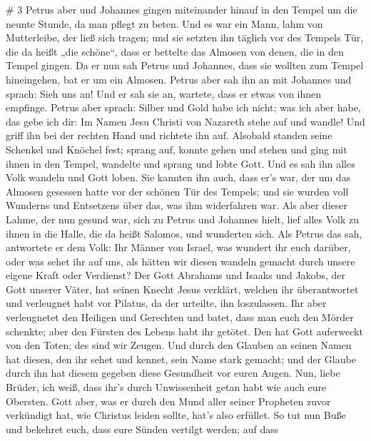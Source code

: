 \# 3  Petrus aber und Johannes gingen miteinander hinauf in
den Tempel um die neunte Stunde, da man pflegt zu beten. 
Und es war ein Mann, lahm von Mutterleibe, der ließ sich tragen; und sie
setzten ihn täglich vor des Tempels Tür, die da heißt „die schöne``,
dass er bettelte das Almosen von denen, die in den Tempel gingen.
 Da er nun sah Petrus und Johannes, dass sie wollten zum
Tempel hineingehen, bat er um ein Almosen.  Petrus aber sah
ihn an mit Johannes und sprach: Sieh uns an!  Und er sah sie
an, wartete, dass er etwas von ihnen empfinge.  Petrus aber
sprach: Silber und Gold habe ich nicht; was ich aber habe, das gebe ich
dir: Im Namen Jesu Christi von Nazareth stehe auf und wandle!
 Und griff ihn bei der rechten Hand und richtete ihn auf.
Alsobald standen seine Schenkel und Knöchel fest;  sprang
auf, konnte gehen und stehen und ging mit ihnen in den Tempel, wandelte
und sprang und lobte Gott.  Und es sah ihn alles Volk
wandeln und Gott loben.  Sie kannten ihn auch, dass er's
war, der um das Almosen gesessen hatte vor der schönen Tür des Tempels;
und sie wurden voll Wunderns und Entsetzens über das, was ihm
widerfahren war.  Als aber dieser Lahme, der nun gesund
war, sich zu Petrus und Johannes hielt, lief alles Volk zu ihnen in die
Halle, die da heißt Salomos, und wunderten sich.  Als
Petrus das sah, antwortete er dem Volk: Ihr Männer von Israel, was
wundert ihr euch darüber, oder was sehet ihr auf uns, als hätten wir
diesen wandeln gemacht durch unsere eigene Kraft oder Verdienst?
 Der Gott Abrahams und Isaaks und Jakobs, der Gott unserer
Väter, hat seinen Knecht Jesus verklärt, welchen ihr überantwortet und
verleugnet habt vor Pilatus, da der urteilte, ihn loszulassen.
 Ihr aber verleugnetet den Heiligen und Gerechten und
batet, dass man euch den Mörder schenkte;  aber den Fürsten
des Lebens habt ihr getötet. Den hat Gott auferweckt von den Toten; des
sind wir Zeugen.  Und durch den Glauben an seinen Namen hat
diesen, den ihr sehet und kennet, sein Name stark gemacht; und der
Glaube durch ihn hat diesem gegeben diese Gesundheit vor euren Augen.
 Nun, liebe Brüder, ich weiß, dass ihr's durch Unwissenheit
getan habt wie auch eure Obersten.  Gott aber, was er durch
den Mund aller seiner Propheten zuvor verkündigt hat, wie Christus
leiden sollte, hat's also erfüllet.  So tut nun Buße und
bekehret euch, dass eure Sünden vertilgt werden;  auf dass
